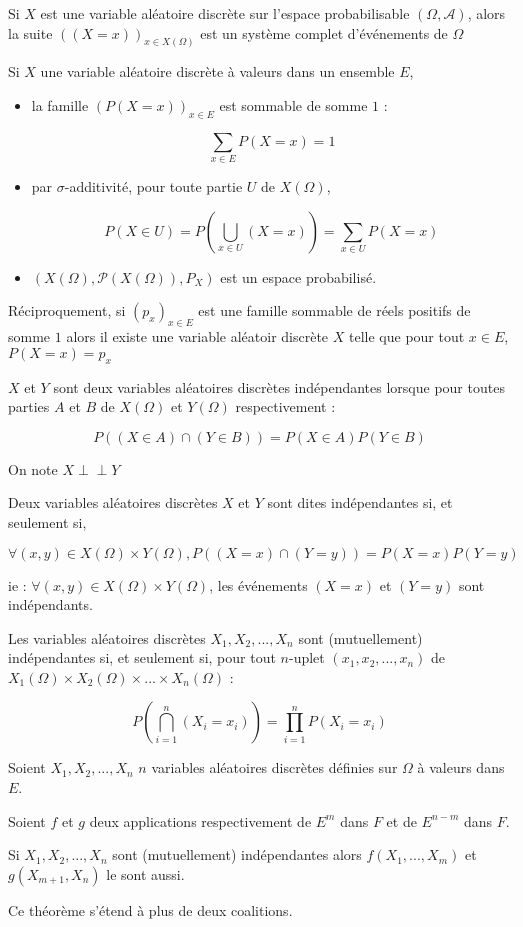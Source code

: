 \documentclass[a4paper,12pt]{book}
\newcommand{\Def}[2]{\begin{tcolorbox}[colback=white,colframe=red!10!green!20!blue!75!, title=Définition : #1]#2\end{tcolorbox}}
\newcommand{\Thr}[2]{\begin{tcolorbox}[sharp corners, colback=white,colframe=red!10!blue!30!green!75!, title=Théorème : #1]#2\end{tcolorbox}}
\newcommand{\ind}{\perp\!\!\!\!\perp}
\begin{document}
\Thr{}{Si $X$ est une variable aléatoire discrète sur l'espace probabilisable $(\Omega, \mathcal{A})$, alors la suite $((X=x))_{x\in X(\Omega)}$ est un système complet d'événements de $\Omega$}
\Thr{}{Si $X$ une variable aléatoire discrète à valeurs dans un ensemble $E$, \begin{itemize}
\item la famille $(P(X=x))_{x\in E}$ est sommable de somme $1$ :
\par $$\sum\limits_{x\in E}P(X=x)=1$$
\item par $\sigma$-additivité, pour toute partie $U$ de $X(\Omega)$,
\par $$P(X\in U)=P\left(\bigcup_{x\in U}(X=x)\right)=\sum\limits_{x\in U}P(X=x)$$
\item $(X(\Omega), \mathcal{P}(X(\Omega)), P_X)$ est un espace probabilisé.
\end{itemize}
Réciproquement, si $(p_x)_{x\in E}$ est une famille sommable de réels positifs de somme $1$ alors il existe une variable aléatoir discrète $X$ telle que pour tout $x\in E$, $P(X=x)=p_x$}
\Def{}{$X$ et $Y$ sont deux variables aléatoires discrètes indépendantes lorsque pour toutes parties $A$ et $B$ de $X(\Omega)$ et $Y(\Omega)$ respectivement :
\par $$P((X\in A)\cap (Y\in B))=P(X\in A)P(Y\in B)$$
\par On note $X\ind Y$}
\Thr{}{Deux variables aléatoires discrètes $X$ et $Y$ sont dites indépendantes si, et seulement si,
\par $$\forall (x,y)\in X(\Omega)\times Y(\Omega), P((X=x)\cap (Y=y))=P(X=x)P(Y=y)$$
\par ie : $\forall (x,y)\in X(\Omega)\times Y(\Omega)$, les événements $(X=x)$ et $(Y=y)$ sont indépendants.}
\Thr{}{Les variables aléatoires discrètes $X_1,X_2,...,X_n$ sont (mutuellement) indépendantes si, et seulement si, pour tout $n$-uplet $(x_1,x_2,...,x_n)$ de $X_1(\Omega)\times X_2(\Omega)\times...\times X_n(\Omega)$ :
\par $$P\left(\bigcap_{i=1}^n(X_i=x_i)\right)=\prod\limits_{i=1}^nP(X_i=x_i)$$}
\Thr{Lemme des coalitions}{Soient $X_1,X_2,...,X_n$ $n$ variables aléatoires discrètes définies sur $\Omega$ à valeurs dans $E$.
\par Soient $f$ et $g$ deux applications respectivement de $E^m$ dans $F$ et de $E^{n-m}$ dans $F$.
\par Si $X_1,X_2,..., X_n$ sont (mutuellement) indépendantes alors $f(X_1,..., X_m)$ et $g(X_{m+1}, X_n)$ le sont aussi.
\par Ce théorème s'étend à plus de deux coalitions.}
\end{document}
